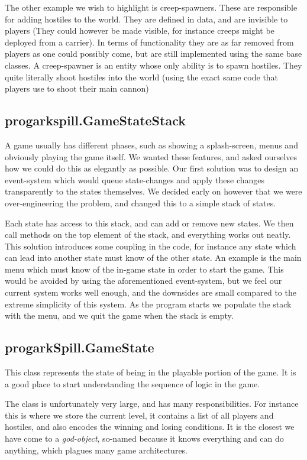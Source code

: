 The other example we wish to highlight is creep-spawners. These are responsible
for adding hostiles to the world. They are defined in data, and are invisible
to players (They could however be made visible, for instance creeps might be
deployed from a carrier). In terms of functionality they are as far removed 
from players as one could possibly come, but are still implemented using the
same base classes.  A creep-spawner is an entity whose only ability is to spawn
hostiles. They quite literally shoot hostiles into the world (using the exact
same code that players use to shoot their main cannon)

\subsection{progarkspill.GameStateStack}
A game usually has different phases, such as showing a splash-screen, menus and
obviously playing the game itself. We wanted these features, and asked 
ourselves how we could do this as elegantly as possible.  Our first solution
was to design an event-system which would queue state-changes and apply these
changes transparently to the states themselves. We decided early on however 
that we were over-engineering the problem, and changed this to a simple stack 
of states.

Each state has access to this stack, and can add or remove new states. We then
call methods on the top element of the stack, and everything works out neatly.
This solution introduces some coupling in the code, for instance any state 
which can lead into another state must know of the other state. An example is
the main menu which must know of the in-game state in order to start the game.
This would be avoided by using the aforementioned event-system, but we feel
our current system works well enough, and the downsides are small compared to
the extreme simplicity of this system. As the program starts we populate the
stack with the menu, and we quit the game when the stack is empty.

\subsection{progarkSpill.GameState}
This class represents the state of being in the playable portion of the game. 
It is a good place to start understanding the sequence of logic in the game.

The class is unfortunately very large, and has many responsibilities. For 
instance this is where we store the current level, it contains a list of all
players and hostiles, and also encodes the winning and losing conditions. It is
the closest we have come to a \emph{god-object}, so-named because it knows
everything and can do anything, which plagues many game architectures.

